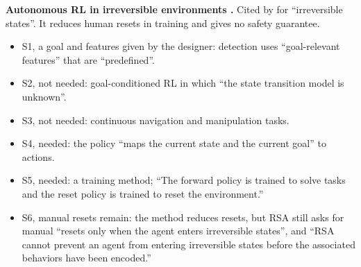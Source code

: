 \documentclass{article}
\providecommand{\tightlist}{\setlength{\itemsep}{0pt}\setlength{\parskip}{0pt}}
\begin{document}
\textbf{Autonomous RL in irreversible environments \citep{lee2025}.} Cited by \citet{mclean2026} for ``irreversible states''. It reduces human resets in training and gives no safety guarantee.

\begin{itemize}
\tightlist
\item
  S1, a goal and features given by the designer: detection uses ``goal-relevant features'' that are ``predefined''.
\item
  S2, not needed: goal-conditioned RL in which ``the state transition model is unknown''.
\item
  S3, not needed: continuous navigation and manipulation tasks.
\item
  S4, needed: the policy ``maps the current state and the current goal'' to actions.
\item
  S5, needed: a training method; ``The forward policy is trained to solve tasks and the reset policy is trained to reset the environment.''
\item
  S6, manual resets remain: the method reduces resets, but RSA still asks for manual ``resets only when the agent enters irreversible states'', and ``RSA cannot prevent an agent from entering irreversible states before the associated behaviors have been encoded.''
\end{itemize}
\end{document}
